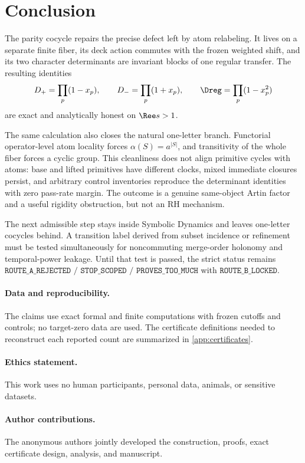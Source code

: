 \section{Conclusion}
\label{sec:conclusion}

The parity cocycle repairs the precise defect left by atom relabeling.  It
lives on a separate finite fiber, its deck action commutes with the frozen
weighted shift, and its two character determinants are invariant blocks of
one regular transfer.  The resulting identities
\[
D_+=\prod_p(1-x_p),\qquad
D_-=\prod_p(1+x_p),\qquad
\Dreg=\prod_p(1-x_p^2)
\]
are exact and analytically honest on \(\Ree s>1\).

The same calculation also closes the natural one-letter branch.  Functorial
operator-level atom locality forces \(\alpha(S)=a^{|S|}\), and transitivity of
the whole fiber forces a cyclic group.  This cleanliness does not align
primitive cycles with atoms: base and lifted primitives have different clocks,
mixed immediate closures persist, and arbitrary control inventories reproduce
the determinant identities with zero pass-rate margin.  The outcome is a
genuine same-object Artin factor and a useful rigidity obstruction, but not an
RH mechanism.

The next admissible step stays inside Symbolic Dynamics and leaves one-letter
cocycles behind.  A transition label derived from subset incidence or
refinement must be tested simultaneously for noncommuting merge-order
holonomy and temporal-power leakage.  Until that test is passed, the strict
status remains
\(\texttt{ROUTE\_A\_REJECTED / STOP\_SCOPED / PROVES\_TOO\_MUCH}\) with
\(\texttt{ROUTE\_B\_LOCKED}\).

\paragraph{Data and reproducibility.}
The claims use exact formal and finite computations with frozen cutoffs and
controls; no target-zero data are used.  The certificate definitions needed
to reconstruct each reported count are summarized in
\cref{app:certificates}.

\paragraph{Ethics statement.}
This work uses no human participants, personal data, animals, or sensitive
datasets.

\paragraph{Author contributions.}
The anonymous authors jointly developed the construction, proofs, exact
certificate design, analysis, and manuscript.

